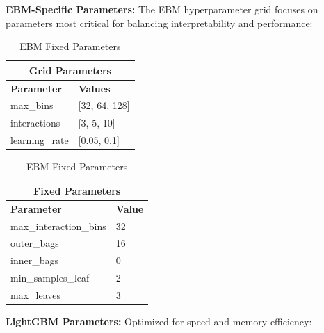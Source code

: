 \documentclass[12pt]{article}
\begin{document}
\textbf{EBM-Specific Parameters:} The EBM hyperparameter grid focuses on parameters most critical for balancing interpretability and performance:
\begin{table}[H]
\centering
\footnotesize
\begin{minipage}{0.48\textwidth}
\centering
\begin{tabular}{|l|l|}
\hline
\multicolumn{2}{|c|}{\textbf{Grid Parameters}} \\
\hline
\textbf{Parameter} & \textbf{Values} \\
\hline
max\_bins & [32, 64, 128] \\
interactions & [3, 5, 10] \\
learning\_rate & [0.05, 0.1] \\
\hline
\end{tabular}
\caption{EBM Grid Parameters}
\end{minipage}
\hfill
\begin{minipage}{0.48\textwidth}
\centering
\begin{tabular}{|l|l|}
\hline
\multicolumn{2}{|c|}{\textbf{Fixed Parameters}} \\
\hline
\textbf{Parameter} & \textbf{Value} \\
\hline
max\_interaction\_bins & 32 \\
outer\_bags & 16 \\
inner\_bags & 0 \\
min\_samples\_leaf & 2 \\
max\_leaves & 3 \\
\hline
\end{tabular}
\caption{EBM Fixed Parameters}
\end{minipage}
\end{table}
\vspace{0.5cm}
\textbf{LightGBM Parameters:} Optimized for speed and memory efficiency:
\end{document}
